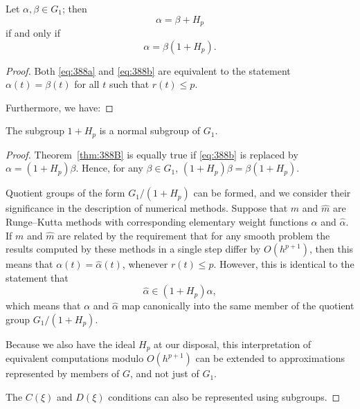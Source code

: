 \begin{theorem}
\begin{theorem}

  \label{thm:388B}
Let \(\alpha, \beta \in G_{1}\); then
\[
\alpha = \beta + H_{p} \tag{388a}
\]
if and only if
\[
\alpha = \beta(1 + H_{p}). \tag{388b}
\]
\end{theorem}

\begin{proof}
Both \eqref{eq:388a} and \eqref{eq:388b} are equivalent to the statement \(\alpha(t) = \beta(t)\) for all \(t\) such that \(r(t) \leq p\).

Furthermore, we have:
\end{proof}

\begin{theorem}

  \label{thm:388C}
The subgroup \(1 + H_p\) is a normal subgroup of \(G_1\).
\end{theorem}

\begin{proof}
Theorem~\ref{thm:388B} is equally true if \eqref{eq:388b} is replaced by \(\alpha = (1 + H_p)\beta\).
Hence, for any \(\beta \in G_1\), \((1 + H_p)\beta = \beta(1 + H_p)\).

Quotient groups of the form \(G_1/(1 + H_p)\) can be formed, and we consider
their significance in the description of numerical methods. Suppose that \(m\) and
\(\widehat{m}\) are Runge--Kutta methods with corresponding elementary weight functions
\(\alpha\) and \(\widehat{\alpha}\). If \(m\) and \(\widehat{m}\) are related by the requirement that for any smooth
problem the results computed by these methods in a single step differ by
\(O(h^{p+1})\), then this means that \(\alpha(t) = \widehat{\alpha}(t)\), whenever \(r(t) \leq p\). However, this
is identical to the statement that
\[
\widehat{\alpha} \in (1 + H_p)\alpha,
\]
which means that \(\alpha\) and \(\widehat{\alpha}\) map canonically into the same member of the
quotient group \(G_1/(1 + H_p)\).

Because we also have the ideal \(H_p\) at our disposal, this interpretation of
equivalent computations modulo \(O(h^{p+1})\) can be extended to approximations
represented by members of \(G\), and not just of \(G_1\).

The \(C(\xi)\) and \(D(\xi)\) conditions can also be represented using subgroups.
\end{proof}


\end{theorem}

